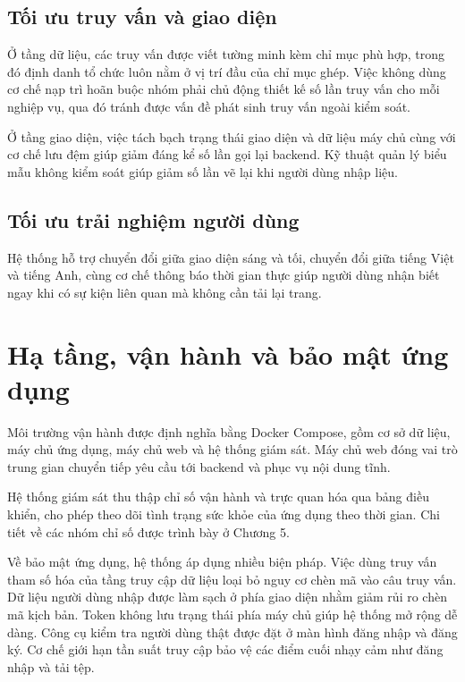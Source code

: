 \documentclass[12pt,a4paper,oneside]{report}
\begin{document}
\subsection{Tối ưu truy vấn và giao diện}

Ở tầng dữ liệu, các truy vấn được viết tường minh kèm chỉ mục phù hợp, trong đó định danh tổ chức luôn nằm ở vị trí đầu của chỉ mục ghép. Việc không dùng cơ chế nạp trì hoãn buộc nhóm phải chủ động thiết kế số lần truy vấn cho mỗi nghiệp vụ, qua đó tránh được vấn đề phát sinh truy vấn ngoài kiểm soát.

Ở tầng giao diện, việc tách bạch trạng thái giao diện và dữ liệu máy chủ cùng với cơ chế lưu đệm giúp giảm đáng kể số lần gọi lại backend. Kỹ thuật quản lý biểu mẫu không kiểm soát giúp giảm số lần vẽ lại khi người dùng nhập liệu.

\subsection{Tối ưu trải nghiệm người dùng}

Hệ thống hỗ trợ chuyển đổi giữa giao diện sáng và tối, chuyển đổi giữa tiếng Việt và tiếng Anh, cùng cơ chế thông báo thời gian thực giúp người dùng nhận biết ngay khi có sự kiện liên quan mà không cần tải lại trang.

\section{Hạ tầng, vận hành và bảo mật ứng dụng}

Môi trường vận hành được định nghĩa bằng Docker Compose, gồm cơ sở dữ liệu, máy chủ ứng dụng, máy chủ web và hệ thống giám sát. Máy chủ web đóng vai trò trung gian chuyển tiếp yêu cầu tới backend và phục vụ nội dung tĩnh.

Hệ thống giám sát thu thập chỉ số vận hành và trực quan hóa qua bảng điều khiển, cho phép theo dõi tình trạng sức khỏe của ứng dụng theo thời gian. Chi tiết về các nhóm chỉ số được trình bày ở Chương 5.

Về bảo mật ứng dụng, hệ thống áp dụng nhiều biện pháp. Việc dùng truy vấn tham số hóa của tầng truy cập dữ liệu loại bỏ nguy cơ chèn mã vào câu truy vấn. Dữ liệu người dùng nhập được làm sạch ở phía giao diện nhằm giảm rủi ro chèn mã kịch bản. Token không lưu trạng thái phía máy chủ giúp hệ thống mở rộng dễ dàng. Công cụ kiểm tra người dùng thật được đặt ở màn hình đăng nhập và đăng ký. Cơ chế giới hạn tần suất truy cập bảo vệ các điểm cuối nhạy cảm như đăng nhập và tải tệp.
\end{document}
